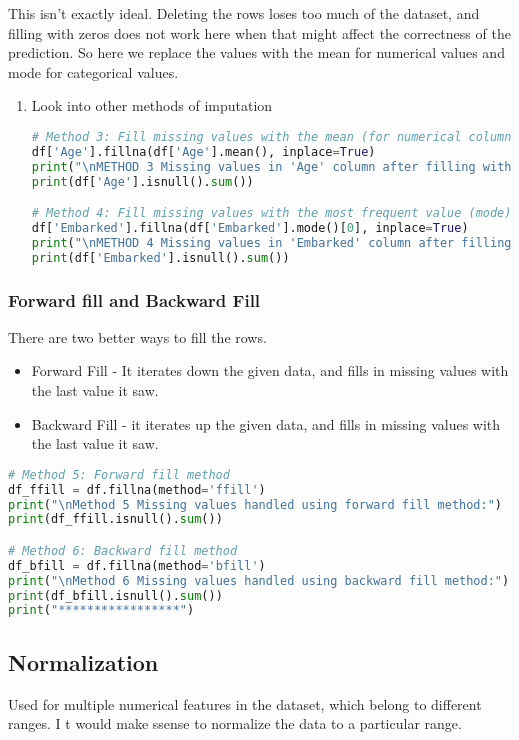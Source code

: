 \documentclass[11pt]{article}
\begin{document}
This isn't exactly ideal. Deleting the rows loses too  much of the dataset, and filling with zeros does not work here when that might affect the correctness of the prediction.
So here we replace the values with the mean for numerical values and mode for categorical values.
\begin{enumerate}
\item Look into other methods of imputation
\label{sec:orgf20e454}
\begin{lstlisting}[language=Python,numbers=none]
# Method 3: Fill missing values with the mean (for numerical columns)
df['Age'].fillna(df['Age'].mean(), inplace=True)
print("\nMETHOD 3 Missing values in 'Age' column after filling with mean:")
print(df['Age'].isnull().sum())

# Method 4: Fill missing values with the most frequent value (mode)
df['Embarked'].fillna(df['Embarked'].mode()[0], inplace=True)
print("\nMETHOD 4 Missing values in 'Embarked' column after filling with mode:")
print(df['Embarked'].isnull().sum())
\end{lstlisting}
\end{enumerate}
\subsubsection{Forward fill and Backward Fill}
\label{sec:org9ff0bb5}
There are two better ways to fill the rows.
\begin{itemize}
\item Forward Fill - It iterates down the given data, and fills in missing values with the last value it saw.
\item Backward Fill - it iterates up the given data, and fills in missing values with the last value it saw.
\end{itemize}
\begin{lstlisting}[language=Python,numbers=none]
# Method 5: Forward fill method
df_ffill = df.fillna(method='ffill')
print("\nMethod 5 Missing values handled using forward fill method:")
print(df_ffill.isnull().sum())

# Method 6: Backward fill method
df_bfill = df.fillna(method='bfill')
print("\nMethod 6 Missing values handled using backward fill method:")
print(df_bfill.isnull().sum())
print("*****************")
\end{lstlisting}
\subsection{Normalization}
\label{sec:org06189fc}
Used for multiple numerical features in the dataset, which belong to different ranges. I t would make ssense to normalize the data to a particular range.
\end{document}
